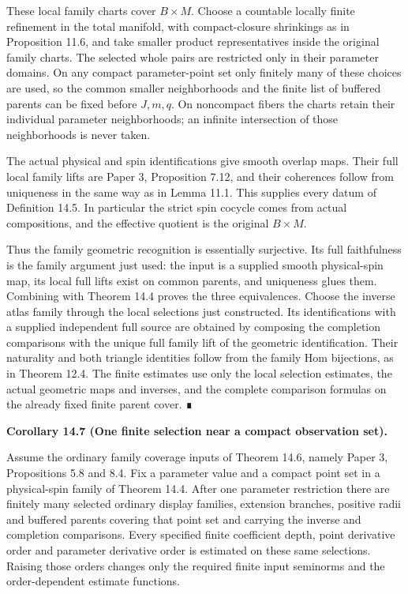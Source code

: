 \documentclass[
  english,
  11pt,
  reqno]{amsart}
\makeatletter
\newcommand{\pandocstatementheading}[1]{%
  \par\addpenalty{\@beginparpenalty}%
  \addvspace{.5\baselineskip plus .2\baselineskip minus .2\baselineskip}%
  {\normalfont\bfseries #1\par}%
  \nobreak\@afterindenttrue\@afterheading
}
\makeatother
\begin{document}
These local family charts cover \(B\times M\). Choose a countable
locally finite refinement in the total manifold, with compact-closure
shrinkings as in Proposition 11.6, and take smaller product
representatives inside the original family charts. The selected whole
pairs are restricted only in their parameter domains. On any compact
parameter-point set only finitely many of these choices are used, so the
common smaller neighborhoods and the finite list of buffered parents can
be fixed before \(J,m,q\). On noncompact fibers the charts retain their
individual parameter neighborhoods; an infinite intersection of those
neighborhoods is never taken.

The actual physical and spin identifications give smooth overlap maps.
Their full local family lifts are Paper 3, Proposition 7.12, and their
coherences follow from uniqueness in the same way as in Lemma 11.1. This
supplies every datum of Definition 14.5. In particular the strict spin
cocycle comes from actual compositions, and the effective quotient is
the original \(B\times M\).

Thus the family geometric recognition is essentially surjective. Its
full faithfulness is the family argument just used: the input is a
supplied smooth physical-spin map, its local full lifts exist on common
parents, and uniqueness glues them. Combining with Theorem 14.4 proves
the three equivalences. Choose the inverse atlas family through the
local selections just constructed. Its identifications with a supplied
independent full source are obtained by composing the completion
comparisons with the unique full family lift of the geometric
identification. Their naturality and both triangle identities follow
from the family Hom bijections, as in Theorem 12.4. The finite estimates
use only the local selection estimates, the actual geometric maps and
inverses, and the complete comparison formulas on the already fixed
finite parent cover. ∎

\pandocstatementheading{\protect{}\label{cor:family-controlled-compact-selections}Corollary 14.7 (One finite selection near a compact observation set).}

Assume the ordinary family coverage inputs of Theorem 14.6, namely Paper
3, Propositions 5.8 and 8.4. Fix a parameter value and a compact point
set in a physical-spin family of Theorem 14.4. After one parameter
restriction there are finitely many selected ordinary display families,
extension branches, positive radii and buffered parents covering that
point set and carrying the inverse and completion comparisons. Every
specified finite coefficient depth, point derivative order and parameter
derivative order is estimated on these same selections. Raising those
orders changes only the required finite input seminorms and the
order-dependent estimate functions.
\end{document}
